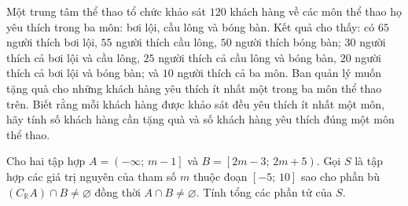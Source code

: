 
\begin{bt}%
	Một trung tâm thể thao tổ chức khảo sát $120$ khách hàng về các môn thể thao họ yêu thích trong ba môn: bơi lội, cầu lông và bóng bàn. Kết quả cho thấy: có $65$ người thích bơi lội, $55$ người thích cầu lông, $50$ người thích bóng bàn; $30$ người thích cả bơi lội và cầu lông, $25$ người thích cả cầu lông và bóng bàn, $20$ người thích cả bơi lội và bóng bàn; và $10$ người thích cả ba môn. Ban quản lý muốn tặng quà cho những khách hàng yêu thích ít nhất một trong ba môn thể thao trên. Biết rằng mỗi khách hàng được khảo sát đều yêu thích ít nhất một môn, hãy tính số khách hàng cần tặng quà và số khách hàng yêu thích đúng một môn thể thao.
	
\end{bt}

\begin{bt}%
	Cho hai tập hợp $A=\left(-\infty;\, m-1\right]$ và $B=\left[2m-3;\, 2m+5\right)$. Gọi $S$ là tập hợp các giá trị nguyên của tham số $m$ thuộc đoạn $[-5;\,10]$ sao cho phần bù $\left(C_{\mathbb{R}}A\right)\cap B\neq\varnothing$ đồng thời $A\cap B\neq\varnothing$. Tính tổng các phần tử của $S$.
	
\end{bt}

